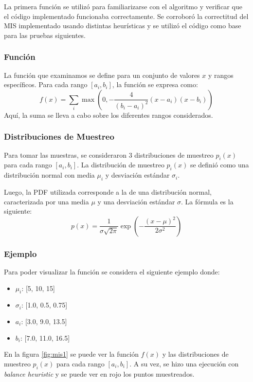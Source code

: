 \documentclass{article}
\begin{document}
La primera función se utilizó para familiarizarse con el algoritmo y verificar que el código implementado funcionaba correctamente.
Se corroboró la correctitud del MIS implementado usando distintas heurísticas y se utilizó el código como base para las pruebas siguientes.

\subsubsection{Función}
La función que examinamos se define para un conjunto de valores \( x \) y rangos específicos. Para cada rango \( [a_{i}, b_{i}] \), la función se expresa como:
$$
f(x) = \sum_{i} \max\left(0, -\frac{4}{(b_{i} - a_{i})^2} (x - a_{i})(x - b_{i})\right)
$$
Aquí, la suma se lleva a cabo sobre los diferentes rangos considerados.

\subsubsection{Distribuciones de Muestreo}

Para tomar las muestras, se consideraron 3 distribuciones de muestreo \( p_{i}(x) \) para cada rango \( [a_{i}, b_{i}] \).
La distribución de muestreo \( p_{i}(x) \) se definió como una distribución normal con media \( \mu_{i} \) y desviación estándar \( \sigma_{i} \).

Luego, la PDF utilizada corresponde a la de una distribución normal, caracterizada por una media \( \mu \) y una desviación estándar \( \sigma \). La fórmula es la siguiente:
$$
p(x) = \frac{1}{\sigma \sqrt{2\pi}} \exp\left(-\frac{(x - \mu)^2}{2\sigma^2}\right)
$$


\subsubsection{Ejemplo}

Para poder visualizar la función se considera el siguiente ejemplo donde:

\begin{itemize}
    \item \textbf{\( \mu_{i} \)}: [5, 10, 15]
    \item \textbf{\( \sigma_{i} \)}: [1.0, 0.5, 0.75]
    \item \textbf{\( a_{i} \)}: [3.0, 9.0, 13.5]
    \item \textbf{\( b_{i} \)}: [7.0, 11.0, 16.5]
\end{itemize}

En la figura \ref{fig:mis1} se puede ver la función \( f(x) \) y las distribuciones de muestreo \( p_{i}(x) \) para cada rango \( [a_{i}, b_{i}] \).
A su vez, se hizo una ejecución con \textit{balance heuristic} y se puede ver en rojo los puntos muestreados.
\end{document}
